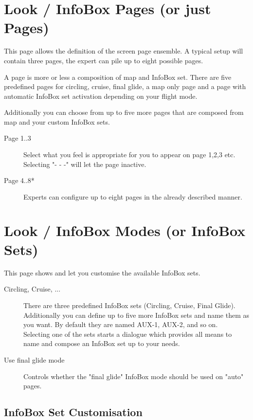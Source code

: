 \section{Look / InfoBox Pages (or just Pages)}

This page allows the definition of the screen page ensemble. A typical setup 
will contain three pages, the expert can pile up to eight possible pages.

A page is more or less a composition of map and InfoBox set. There are five 
predefined pages for circling, cruise, final glide, a map only page and a 
page with automatic InfoBox set activation depending on your flight mode.

Additionally you can choose from up to five more pages that are composed from map 
and your custom InfoBox sets.  

\begin{description}
\item[Page 1..3]  Select what you feel is appropriate for you to appear on page 1,2,3 etc. 
  Selecting "- - -" will let the page inactive.
\item[Page 4..8*]  Experts can configure up to eight pages in the already 
  described manner.
\end{description}


\section{Look / InfoBox Modes (or InfoBox Sets)}\label{sec:infobox_sets}

This page shows and let you customise the available InfoBox sets.

\begin{description}
\item[Circling, Cruise, ...]  There are three predefined InfoBox sets (Circling, Cruise, Final Glide). 
  Additionally you can define up to five more InfoBox sets and name them as you want.   
  By default they are named AUX-1, AUX-2, and so on. \\
  Selecting one of the sets starts a dialogue which provides all means to name and 
  compose an InfoBox set up to your needs.

\item[Use final glide mode]  Controls whether the "final glide" InfoBox mode should be used on "auto" pages.
\end{description}

\subsection*{InfoBox Set Customisation}

